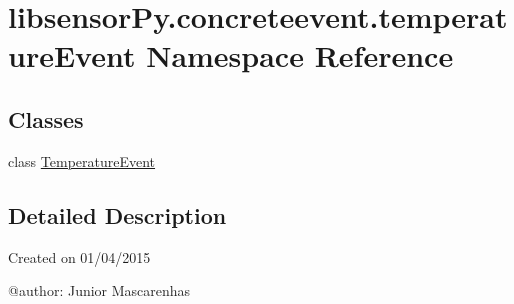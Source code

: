 \hypertarget{namespacelibsensorPy_1_1concreteevent_1_1temperatureEvent}{}\section{libsensor\+Py.\+concreteevent.\+temperature\+Event Namespace Reference}
\label{namespacelibsensorPy_1_1concreteevent_1_1temperatureEvent}
\subsection*{Classes}
\begin{DoxyCompactItemize}
\item 
class \hyperlink{classlibsensorPy_1_1concreteevent_1_1temperatureEvent_1_1TemperatureEvent}{Temperature\+Event}
\end{DoxyCompactItemize}


\subsection{Detailed Description}
\begin{DoxyVerb}Created on 01/04/2015

@author: Junior Mascarenhas
\end{DoxyVerb}
 